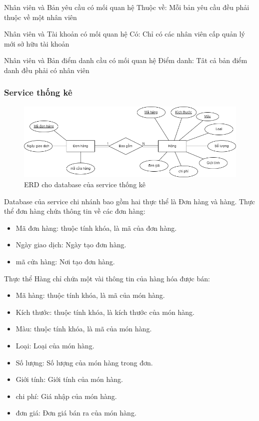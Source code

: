 Nhân viên và Bản yêu cầu có mối quan hệ Thuộc về: Mỗi bản yêu cầu đều phải thuộc về một nhân viên

Nhân viên và Tài khoản có mối quan hệ Có: Chỉ có các nhân viên cấp quản lý mới sở hữu tài khoản

Nhân viên và Bản điểm danh cầu có mối quan hệ Điểm danh: Tât cả bản điểm danh đều phải có nhân viên


\subsubsection{Service thống kê}
\begin{figure}[!htp]
	\begin{center}
		\includegraphics[width=1\textwidth]{img/database/erd/Statistic.png}
		\newline
		\caption{ERD cho database của service thống kê}
	\end{center}
\end{figure}

Database của service chi nhánh bao gồm hai thực thể là Đơn hàng và hàng. Thực thể đơn hàng chứa thông tin về các đơn hàng:
\begin{itemize}
	\item Mã đơn hàng: thuộc tính khóa, là mã của đơn hàng.
	\item Ngày giao dịch: Ngày tạo đơn hàng.
	\item mã cửa hàng: Nơi tạo đơn hàng.
\end{itemize}

Thực thể Hàng chỉ chứa một vài thông tin của hàng hóa được bán:
\begin{itemize}
	\item Mã hàng: thuộc tính khóa, là mã của món hàng.
	\item Kích thước: thuộc tính khóa, là kích thước của món hàng.
	\item Màu: thuộc tính khóa, là mã của món hàng.
	\item Loại: Loại của món hàng.
	\item Số lượng: Số lượng của món hàng trong đơn.
	\item Giới tính: Giới tính của món hàng.
	\item chi phí: Giá nhập của món hàng.
	\item đơn giá: Đơn giá bán ra của món hàng.
\end{itemize}

